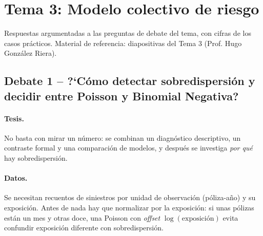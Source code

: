 \documentclass[a4paper,12pt]{article}
\begin{document}
\restoregeometry
\newpage
{}
\setcounter{page}{1}

\section{Tema 3: Modelo colectivo de riesgo}
\label{sec:tema3debate}
\noindent
Respuestas argumentadas a las preguntas de debate del tema, con cifras de los casos prácticos. Material de referencia: diapositivas del Tema 3 (Prof. Hugo González Riera).

\subsection{Debate 1 -- ?`C\'omo detectar sobredispersi\'on y decidir entre Poisson y Binomial Negativa?}

\paragraph{Tesis.} No basta con mirar un n\'umero: se combinan un diagn\'ostico descriptivo, un contraste formal y una comparaci\'on de modelos, y despu\'es se investiga \emph{por qu\'e} hay sobredispersi\'on.

\paragraph{Datos.} Se necesitan recuentos de siniestros por unidad de observaci\'on (p\'oliza-a\~no) y su exposici\'on. Antes de nada hay que normalizar por la exposici\'on: si unas p\'olizas est\'an un mes y otras doce, una Poisson con \emph{offset} $\log(\text{exposici\'on})$ evita confundir exposici\'on diferente con sobredispersi\'on.
\end{document}

